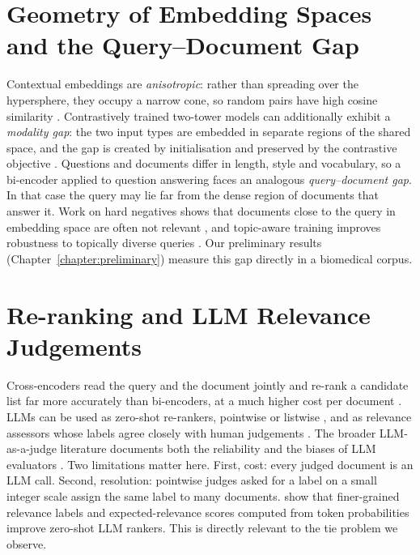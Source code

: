 \section{Geometry of Embedding Spaces and the Query--Document Gap}

Contextual embeddings are \emph{anisotropic}: rather than spreading over the hypersphere, they occupy a narrow cone, so random pairs have high cosine similarity \citep{ethayarajh2019contextual}. Contrastively trained two-tower models can additionally exhibit a \emph{modality gap}: the two input types are embedded in separate regions of the shared space, and the gap is created by initialisation and preserved by the contrastive objective \citep{liang2022modalitygap}. Questions and documents differ in length, style and vocabulary, so a bi-encoder applied to question answering faces an analogous \emph{query--document gap}. In that case the query may lie far from the dense region of documents that answer it. Work on hard negatives shows that documents close to the query in embedding space are often not relevant \citep{xiong2021ance}, and topic-aware training improves robustness to topically diverse queries \citep{hofstatter2021tasb}. Our preliminary results (Chapter~\ref{chapter:preliminary}) measure this gap directly in a biomedical corpus.

\section{Re-ranking and LLM Relevance Judgements}

Cross-encoders read the query and the document jointly and re-rank a candidate list far more accurately than bi-encoders, at a much higher cost per document \citep{nogueira2019passage}. LLMs can be used as zero-shot re-rankers, pointwise or listwise \citep{sun2023rankgpt}, and as relevance assessors whose labels agree closely with human judgements \citep{thomas2024llmjudge,faggioli2023perspectives}. The broader LLM-as-a-judge literature documents both the reliability and the biases of LLM evaluators \citep{zheng2023judging}. Two limitations matter here. First, cost: every judged document is an LLM call. Second, resolution: pointwise judges asked for a label on a small integer scale assign the same label to many documents. \citet{zhuang2024beyond} show that finer-grained relevance labels and expected-relevance scores computed from token probabilities improve zero-shot LLM rankers. This is directly relevant to the tie problem we observe.


